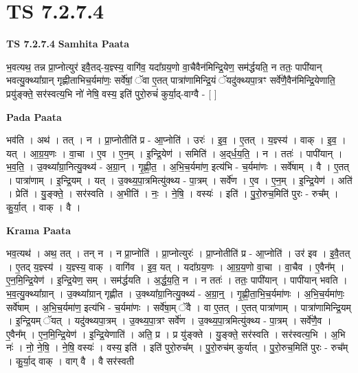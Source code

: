 \documentclass[17pt]{extarticle}
\begin{document}
\section{ TS 7.2.7.4 }

\textbf{TS 7.2.7.4 } \newline
\textbf{Samhita Paata} \newline

भ॒वत्यथ॒ तन्न प्रा॒प्नोत्युर॑ इवै॒तद्-य॒ज्ञ्स्य॒ वागि॑व॒ यदा᳚ग्रय॒णो वा॒चैवैन॑मिन्द्रि॒येण॒ सम॑र्द्धयति॒ न ततः॒ पापी॑यान् भवत्यु॒क्थ्या᳚ग्रान् गृह्णीताभिच॒र्यमा॑णः॒ सर्वे॑षां॒ ॅवा ए॒तत् पात्रा॑णामिन्द्रि॒यं ॅयदु॑क्थ्यपा॒त्रꣳ सर्वे॑णै॒वैन॑मिन्द्रि॒येणाति॒ प्रयु॑ङ्क्ते॒ सर॑स्वत्य॒भि नो॑ नेषि॒ वस्य॒ इति॑ पुरो॒रुचं॑ कुर्या॒द्-वाग्वै - [  ] \newline

\textbf{Pada Paata} \newline

भव॑ति । अथ॑ । तत् । न । प्रा॒प्नोतीति॑ प्र - आ॒प्नोति॑ । उरः॑ । इ॒व॒ । ए॒तत् । य॒ज्ञ्स्य॑ । वाक् । इ॒व॒ । यत् । आ॒ग्र॒य॒णः । वा॒चा । ए॒व । ए॒न॒म् । इ॒न्द्रि॒येण॑ । समिति॑ । अ॒द्‌र्ध॒य॒ति॒ । न । ततः॑ । पापी॑यान् । भ॒व॒ति॒ । उ॒क्थ्या᳚ग्रा॒नित्यु॒क्थ्य॑ - अ॒ग्रा॒न् । गृ॒ह्णी॒त॒ । अ॒भि॒च॒र्यमा॑ण॒ इत्य॑भि - च॒र्यमा॑णः । सर्वे॑षाम् । वै । ए॒तत् । पात्रा॑णाम् । इ॒न्द्रि॒यम् । यत् । उ॒क्थ्य॒पा॒त्रमित्यु॑क्थ्य - पा॒त्रम् । सर्वे॑ण । ए॒व । ए॒न॒म् । इ॒न्द्रि॒येण॑ । अति॑ । प्रेति॑ । यु॒ङ्क्ते॒ । सर॑स्वति । अ॒भीति॑ । नः॒ । ने॒षि॒ । वस्यः॑ । इति॑ । पु॒रो॒रुच॒मिति॑ पुरः - रुच᳚म् । कु॒र्या॒त् । वाक् । वै ।  \newline


\textbf{Krama Paata} \newline

भव॒त्यथ॑ । अथ॒ तत् । तन् न । न प्रा॒प्नोति॑ । प्रा॒प्नोत्युरः॑ । प्रा॒प्नोतीति॑ प्र - आ॒प्नोति॑ । उर॑ इव । इ॒वै॒तत् । ए॒तद् य॒ज्ञ्स्य॑ । य॒ज्ञ्स्य॒ वाक् । वागि॑व । इ॒व॒ यत् । यदा᳚ग्रय॒णः । आ॒ग्र॒य॒णो वा॒चा । वा॒चैव । ए॒वैन᳚म् । ए॒न॒मि॒न्द्रि॒येण॑ । इ॒न्द्रि॒येण॒ सम् । सम॑र्द्धयति । अ॒र्द्ध॒य॒ति॒ न । न ततः॑ । ततः॒ पापी॑यान् । पापी॑यान् भवति । भ॒व॒त्यु॒क्थ्या᳚ग्रान् । उ॒क्थ्या᳚ग्रान् गृह्णीत । उ॒क्थ्या᳚ग्रा॒नित्यु॒क्थ्य॑ - अ॒ग्रा॒न्॒ । गृ॒ह्णी॒ता॒भि॒च॒र्यमा॑णः । अ॒भि॒च॒र्यमा॑णः॒ सर्वे॑षाम् । अ॒भि॒च॒र्यमा॑ण॒ इत्य॑भि - च॒र्यमा॑णः । सर्वे॑षा॒म् ॅवै । वा ए॒तत् । ए॒तत् पात्रा॑णाम् । पात्रा॑णामिन्द्रि॒यम् । इ॒न्द्रि॒यम् ॅयत् । यदु॑क्थ्यपा॒त्रम् । उ॒क्थ्य॒पा॒त्रꣳ सर्वे॑ण । उ॒क्थ्य॒पा॒त्रमित्यु॑क्थ्य - पा॒त्रम् । सर्वे॑णै॒व । ए॒वैन᳚म् । ए॒न॒मि॒न्द्रि॒येण॑ । इ॒न्द्रि॒येणाति॑ । अति॒ प्र । प्र यु॑ङ्‍क्ते । यु॒ङ्‍क्ते॒ सर॑स्वति । सर॑स्वत्य॒भि । अ॒भि नः॑ । नो॒ ने॒षि॒ । ने॒षि॒ वस्यः॑ । वस्य॒ इति॑ । इति॑ पुरो॒रुच᳚म् । पु॒रो॒रुच॑म् कुर्यात् । पु॒रो॒रुच॒मिति॑ पुरः - रुच᳚म् । कु॒र्या॒द् वाक् । वाग् वै । वै सर॑स्वती \newline
\end{document}
